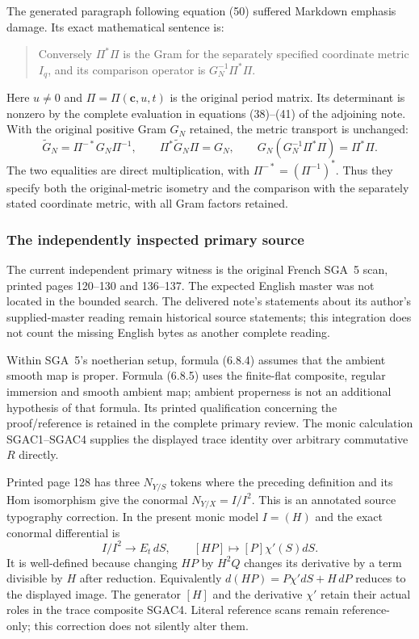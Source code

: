 The generated paragraph following equation (50) suffered Markdown
emphasis damage.  Its exact mathematical sentence is:
\begin{quote}
Conversely $\Pi^*\Pi$ is the Gram for the separately specified
coordinate metric $I_q$, and its comparison operator is
$G_N^{-1}\Pi^*\Pi$.
\end{quote}
Here $u\ne0$ and $\Pi=\Pi(\mathbf c,u,t)$ is the original period
matrix.  Its determinant is nonzero by the complete evaluation in
equations (38)--(41) of the adjoining note.  With the original positive
Gram $G_N$ retained, the metric transport is unchanged:
\[
 \widetilde G_N=\Pi^{-*}G_N\Pi^{-1},\qquad
 \Pi^*\widetilde G_N\Pi=G_N,
 \qquad G_N(G_N^{-1}\Pi^*\Pi)=\Pi^*\Pi.
 \tag{SGAC7}
\]
The two equalities are direct multiplication, with
$\Pi^{-*}=(\Pi^{-1})^*$.  Thus they specify both the original-metric
isometry and the comparison with the separately stated coordinate
metric, with all Gram factors retained.

\subsubsection{The independently inspected primary source}

The current independent primary witness is the original French
SGA~5 scan, printed pages 120--130 and 136--137.  The expected English
master was not located in the bounded search.  The delivered note's
statements about its author's supplied-master reading remain historical
source statements; this integration does not count the missing English
bytes as another complete reading.

Within SGA~5's noetherian setup, formula (6.8.4) assumes that the
ambient smooth map is proper.  Formula (6.8.5) uses the finite-flat
composite, regular immersion and smooth ambient map; ambient properness
is not an additional hypothesis of that formula.  Its printed
qualification concerning the proof/reference is retained in the
complete primary review.  The monic calculation SGAC1--SGAC4 supplies
the displayed trace identity over arbitrary commutative $R$ directly.

Printed page 128 has three $N_{Y/S}$ tokens where the preceding
definition and its Hom isomorphism give the conormal
$N_{Y/X}=I/I^2$.  This is an annotated source typography correction.
In the present monic model $I=(H)$ and the exact conormal differential is
\[
 I/I^2\longrightarrow E_t\,dS,\qquad
 [H P]\longmapsto[P]\chi'(S)dS.
 \tag{SGAC8}
\]
It is well-defined because changing $HP$ by $H^2Q$ changes its
derivative by a term divisible by $H$ after reduction.  Equivalently
$d(HP)=P\chi'dS+H\,dP$ reduces to the displayed image.  The
generator $[H]$ and the derivative $\chi'$ retain their actual
roles in the trace composite SGAC4.  Literal reference scans remain
reference-only; this correction does not silently alter them.

